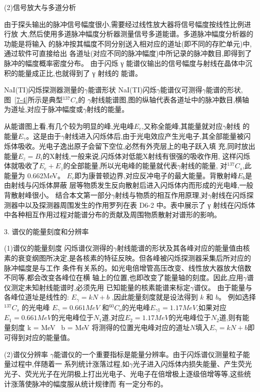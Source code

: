 \documentclass[11pt,a4paper]{ctexart}
\begin{document}
(2)信号放大与多道分析

由于探头输出的脉冲信号幅度很小,需要经过线性放大器将信号幅度按线性比例进行放
大,然后使用多道脉冲幅度分析器测量信号多道能谱。多道脉冲幅度分析器的功能是将输入
的脉冲按其幅度不同分别送入相对应的道址(即不同的存贮单元)中,通过软件可直接给出
各道址(对应不同的脉冲幅度)中所记录的脉冲数目,即得到了脉冲的幅度概率密度分布。
由于闪烁 γ 能谱仪输出的信号幅度与射线在晶体中沉积的能量成正比,也就得到了 γ 射线的
能谱。

NaI(TI)闪烁探测器测量的$\gamma$能谱形状
NaI(TI)闪烁$\gamma$能谱仪可测得$\gamma$能谱的形状,图~\ref{7-4}所示是典型$^{137}C_s$的 $\gamma$射线能谱图,图的纵轴代表各道址中的脉冲数目,横轴为道址,对应于脉冲幅度或$\gamma$射线的能量。

从能谱图上看,有几个较为明显的峰,光电峰$E_e$,又称全能峰,其能量就对应$\gamma$射线
的能量$E_\gamma$。这是由于$\gamma$射线进入闪烁体后,由于光电效应产生光电子,其全部能量被闪烁体吸收。光电子逸出原子会留下空位,必然有外壳层上的电子跃入填
充,同时放出能量$E_z = B_i$的X射线,一般来说,闪烁体对低能X射线有很强的吸收作用,
这样闪烁体就吸收了$E_e+E_z$的全部能量,所以光电峰的能量就代表$\gamma$射线的能量,
对$^{137}C_s$,此能量为 0.662MeV。
$E_c$即为康普顿边界,对应反冲电子的最大能量。背散射峰$E_b$是由射线与闪烁体屏蔽
层等物质发生反向散射后进入闪烁体内而形成的光电峰,一般背散射峰很小。
结合本文第一部分$\gamma$射线与物质的相互作用原理,对$\gamma$射线在闪烁探测器中以及探测器周围发生的作用罗列在表 D6-2 中。表中展示了 γ 射线在闪烁体中各种相互作用过程对能谱分布的贡献及周围物质散射对谱形的影响。


3. 谱仪的能量刻度和分辨率

(1)谱仪的能量刻度
闪烁谱仪测得的$\gamma$射线能谱的形状及其各峰对应的能量值由核素的衰变纲图所决定,是各核素的特征反映。但各峰被闪烁探测器采集后所对应的脉冲幅度是与工作
条件有关系的。如光电倍增管高压改变、线性放大器放大倍数不同等,都会改变各峰位在横
轴上的位置,也即改变了能量轴的刻度。因此,应用$\gamma$谱仪测定未知射线能谱时,必须先用
已知能量的核素能谱来标定$\gamma$谱仪。
由于能量与各峰位道址是线性的: $E_\gamma = kN+b$ ,因此能量刻度就是设法得到 $k$ 和 $b$。
例如选择$^{137}C_s$ 的光电峰 $E_\gamma =0.661 MeV$ 和$^{60}C_o$的光电峰$E_{\gamma 1}=1.17MeV$,如果对应$E_1=0.661 MeV$的光电峰位于$N_1$道,对应$E_2 = 1.17MeV$的光电峰位于$N_2$道,则有能量刻度
\beq
k =  MeV \,\,\,b = MeV
\eeq
将测得的位置光电峰对应的道址$N$填入$E_\gamma = kN+b$即可得到对应的能量值。

(2)谱仪分辨率
$\gamma$能谱仪的一个重要指标是能量分辨率。由于闪烁谱仪测量粒子能量过程中,伴随着一
系列统计涨落过程,如$\gamma$光子进入闪烁体内损失能量、产生荧光光子、荧光光子在光阴极上打出光电子、光电子在倍增极上逐级倍增等等,这些统计涨落使脉冲的幅度服从统计规律而
有一定分布的。
\end{document}
